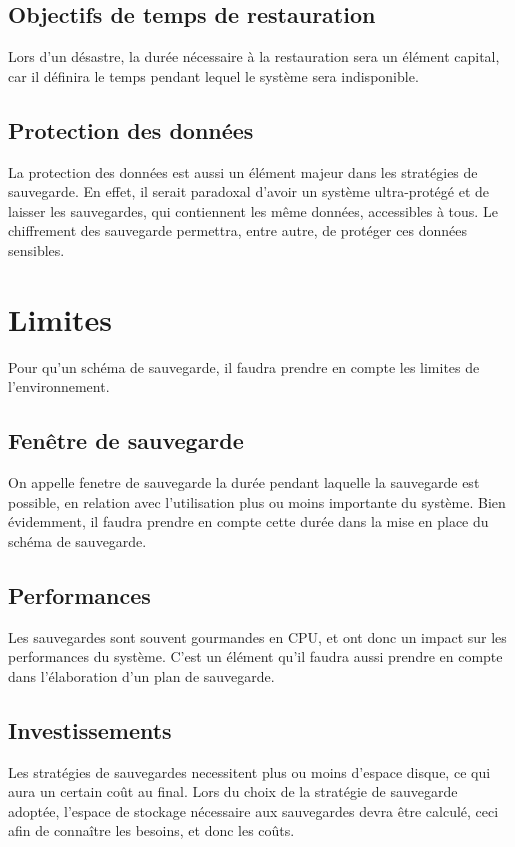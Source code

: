 \documentclass[a4paper,11pt]{report}
\begin{document}
\subsection{Objectifs de temps de restauration}
Lors d'un désastre, la durée nécessaire à la restauration sera un élément capital, car il définira le temps pendant lequel le système sera indisponible.

\subsection{Protection des données}
La protection des données est aussi un élément majeur dans les stratégies de sauvegarde.
En effet, il serait paradoxal d'avoir un système ultra-protégé et de laisser les sauvegardes, qui contiennent les même données, accessibles à tous.
Le chiffrement des sauvegarde permettra, entre autre, de protéger ces données sensibles.

\section{Limites}
Pour qu'un schéma de sauvegarde, il faudra prendre en compte les limites de l'environnement.

\subsection{Fenêtre de sauvegarde}
On appelle fenetre de sauvegarde la durée pendant laquelle la sauvegarde est possible, en relation avec l'utilisation plus ou moins importante du système.
Bien évidemment, il faudra prendre en compte cette durée dans la mise en place du schéma de sauvegarde.

\subsection{Performances}
Les sauvegardes sont souvent gourmandes en CPU, et ont donc un impact sur les performances du système.
C'est un élément qu'il faudra aussi prendre en compte dans l'élaboration d'un plan de sauvegarde.

\subsection{Investissements}
Les stratégies de sauvegardes necessitent plus ou moins d'espace disque, ce qui aura un certain coût au final.
Lors du choix de la stratégie de sauvegarde adoptée, l'espace de stockage nécessaire aux sauvegardes devra être calculé, ceci afin de connaître les besoins, et donc les coûts.
\end{document}
